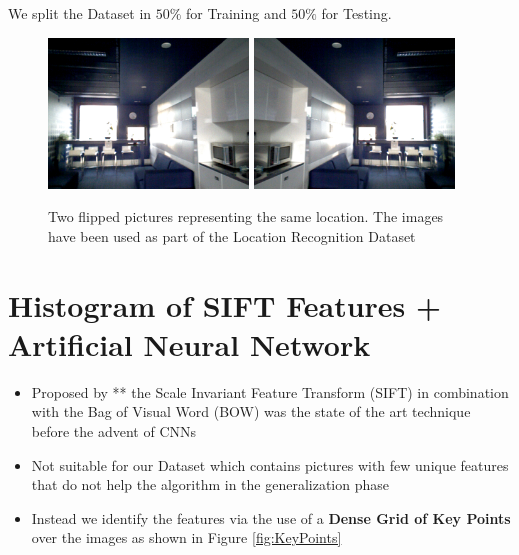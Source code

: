 \documentclass[a0, portrait]{IWIposter}
\begin{document}
\begin{multicols}{3}
\begin{itemize}
We split the Dataset in $50\%$ for Training and $50\%$ for Testing.
\end{itemize}

\begin{figure}
        \includegraphics[width=0.475\textwidth]{Position1.png}
        \hfill
        \includegraphics[width=0.475\textwidth]{Position2.png}
	\caption{Two flipped pictures representing the same location. The images have been used as part of the Location Recognition Dataset}
	\label{fig:FlippedExamples}
\end{figure}


\section*{Histogram of SIFT Features + Artificial Neural Network}
\begin{itemize}
	\item Proposed by ** the Scale Invariant Feature Transform (SIFT) in combination with the Bag of Visual Word (BOW) was the state of the art technique before the advent of CNNs
	\item Not suitable for our Dataset which contains pictures with few unique features that do not help the algorithm in the generalization phase
	\item Instead we identify the features via the use of a \textbf{Dense Grid of Key Points} over the images
	as shown in Figure \ref{fig:KeyPoints}


\end{itemize}
\end{multicols}
\end{document}
